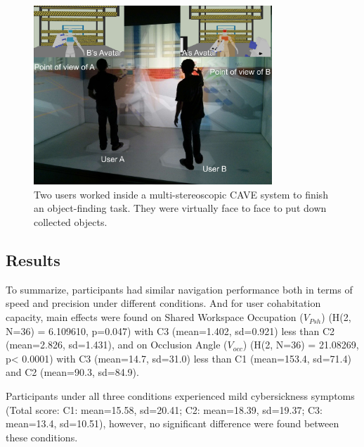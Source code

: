 \begin{figure}[tb]
  \centering
  \includegraphics[width=0.8\textwidth]{figures/ch4/teaser_exp1}
  \caption{\label{fig:4_teaser_exp1}Two users worked inside a multi-stereoscopic CAVE system to finish an object-finding task. They were virtually face to face to put down collected objects.}
\end{figure}

\subsection{Results}
To summarize, participants had similar navigation performance both in terms of speed and precision under different conditions. And for user cohabitation capacity, main effects were found on Shared Workspace Occupation ($V_{Psh}$) (H(2, N=36) = 6.109610, p=0.047) with C3 (mean=1.402, sd=0.921) less than C2 (mean=2.826, sd=1.431), and on Occlusion Angle ($V_{occ}$) (H(2, N=36) = 21.08269, p\textless{} 0.0001) with C3 (mean=14.7, sd=31.0) less than C1 (mean=153.4, sd=71.4) and C2 (mean=90.3, sd=84.9).

Participants under all three conditions experienced mild cybersickness symptoms (Total score: C1: mean=15.58, sd=20.41; C2: mean=18.39, sd=19.37; C3: mean=13.4, sd=10.51), however, no significant difference were found between these conditions.


